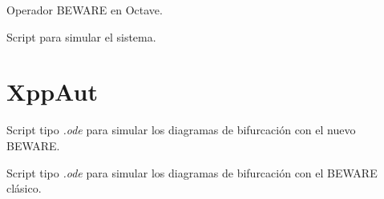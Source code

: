 Operador BEWARE en Octave.



Script para simular el sistema.


\section{XppAut}
Script tipo \textit{.ode} para simular los diagramas de bifurcación con el nuevo BEWARE.



Script tipo \textit{.ode} para simular los diagramas de bifurcación con el BEWARE clásico.


